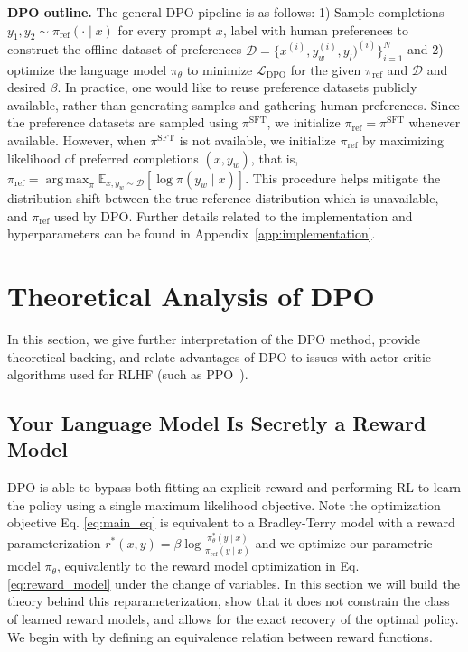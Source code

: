 \documentclass{article}
\newcommand{\rev}[2]{{#2}}
\DeclareMathOperator*{\argmax}{arg\,max}
\newcommand{\piref}{\pi_\text{ref}}
\newcommand{\pisft}{\pi^\text{SFT}} %
\begin{document}
\textbf{DPO outline.} 
The general DPO pipeline is as follows: 1) Sample completions $y_1, y_2 \sim \piref(\cdot \mid x)$ for every prompt $x$, label with human preferences to construct the offline dataset of preferences $\mathcal{D} = \{x^{(i)}, y_w^{(i)}, y_l)^{(i)}\}_{i=1}^N$ and 2) optimize the language model $\pi_\theta$ to minimize $\mathcal{L}_\text{DPO}$ for the given $\piref$ and $\mathcal{D}$ and desired $\beta$. 
In practice, one would like to reuse preference datasets publicly available, rather than generating samples and gathering human preferences. Since the preference datasets are sampled using $\pisft$, we initialize $\piref = \pisft$ whenever available. However, when $\pisft$ is not available, we initialize $\piref$ by maximizing likelihood of preferred completions ${(x, y_w)}$, that is, ${\piref = \argmax_{\pi}\mathbb{E}_{x, y_w \sim \mathcal{D}}\left[\log \pi(y_w \mid x)\right]}$. This procedure helps mitigate the distribution shift between the true reference distribution which is unavailable, and $\piref$ used by DPO. Further details related to the implementation and hyperparameters can be found in Appendix~\ref{app:implementation}.



\section{Theoretical Analysis of DPO}
In this section, we give further interpretation of the DPO method, provide theoretical backing, and relate advantages of DPO to issues with actor critic algorithms used for RLHF (such as PPO~\cite{schulman2017proximal}).

\label{sec:theory}

\subsection{Your Language Model Is Secretly a Reward Model} DPO is able to bypass both \rev{explicit reward estimation}{fitting an explicit reward} and performing RL to learn the policy using a single maximum likelihood objective. Note the optimization objective Eq. \ref{eq:main_eq} is equivalent to a Bradley-Terry model with a reward parameterization $r^*(x, y) = \beta \log\frac{\pi^*_\theta(y \mid x)}{\piref(y \mid x)}$ and we optimize our parametric model $\pi_{\theta}$, equivalently to the reward model optimization in Eq. \ref{eq:reward_model} under the change of variables. In this section we will build the theory behind this reparameterization, show that it does not constrain the class of learned reward models, and allows for the exact recovery of the optimal policy. We begin with by defining an equivalence relation between reward functions. 
\end{document}
